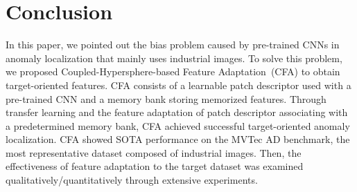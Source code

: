 \documentclass[10pt,twocolumn,letterpaper]{article}
\begin{document}
\section{Conclusion}
    In this paper, we pointed out the bias problem caused by pre-trained CNNs in anomaly localization that mainly uses industrial images. To solve this problem, we proposed Coupled-Hypersphere-based Feature Adaptation~(CFA) to obtain target-oriented features. CFA consists of a learnable patch descriptor used with a pre-trained CNN and a memory bank storing memorized features. Through transfer learning and the feature adaptation of patch descriptor associating with a predetermined memory bank, CFA achieved successful target-oriented anomaly localization. CFA showed SOTA performance on the MVTec AD benchmark, the most representative dataset composed of industrial images. Then, the effectiveness of feature adaptation to the target dataset was examined qualitatively/quantitatively through extensive experiments.

{\small


}
\end{document}
